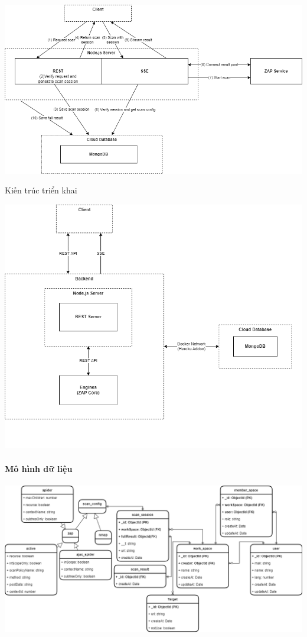 \includegraphics[width=\textwidth]{images/diagram/diagram_25102022/Scan Process.png}

\newpage
Kiến trúc triển khai
\vspace{2cm}

\includegraphics[width=\textwidth]{images/diagram/diagram_25102022/ZAPOP Architecture.png}

\paragraph{Mô hình dữ liệu}
\vspace{2cm}

\includegraphics[width=\textwidth]{images/diagram/diagram_25102022/Database Diagram.png}

